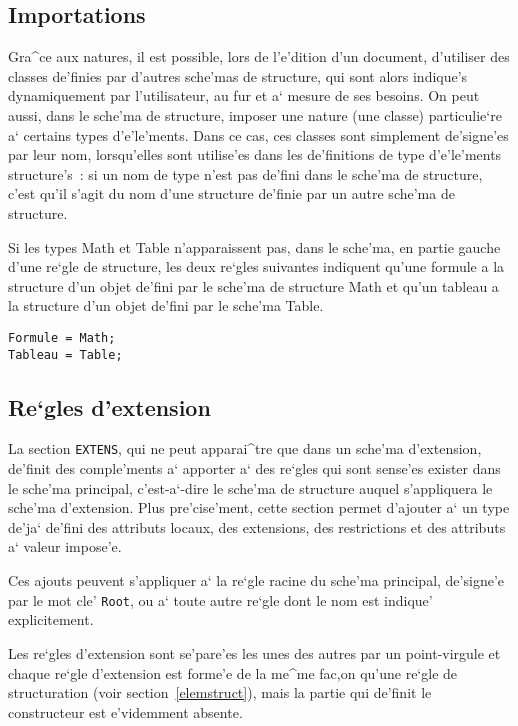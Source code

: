 {\subsection{Importations}

Gra^ce aux natures, il est possible, lors de l'e'dition d'un
document, d'utiliser des classes de'finies par d'autres sche'mas de structure,
qui sont alors indique's dynamiquement par l'utilisateur, au fur et a` mesure
de ses besoins. On peut aussi, dans le sche'ma de structure, imposer une nature
(une classe) particulie`re a` certains types d'e'le'ments. Dans ce cas, ces
classes sont simplement de'signe'es par leur nom, lorsqu'elles sont utilise'es
dans les de'finitions de type d'e'le'ments structure's~: si un nom de type
n'est pas de'fini dans le sche'ma de structure, c'est qu'il s'agit du nom
d'une structure de'finie par un autre sche'ma de structure.

\begin{example}
Si les types Math et Table n'apparaissent pas, dans le sche'ma,
en partie gauche d'une re`gle de structure, les deux re`gles suivantes
indiquent qu'une formule a la structure d'un objet de'fini par le sche'ma
de structure Math et qu'un tableau a la structure d'un objet de'fini
par le sche'ma Table.

\begin{verbatim}
Formule = Math;
Tableau = Table;
\end{verbatim}
\end{example}

\subsection{Re`gles d'extension}

La section {\tt EXTENS}, qui ne peut apparai^tre que dans un sche'ma
d'extension, de'finit des comple'ments a` apporter a` des re`gles qui
sont sense'es exister dans le sche'ma principal, c'est-a`-dire le
sche'ma de structure auquel s'appliquera le
sche'ma d'extension. Plus pre'cise'ment, cette section permet d'ajouter
a` un type de'ja` de'fini des attributs locaux, des extensions, des
restrictions et des attributs a` valeur impose'e.

Ces ajouts peuvent s'appliquer a` la re`gle racine du sche'ma principal,
de'signe'e par le mot cle' {\tt Root}, ou a` toute autre re`gle dont le nom
est indique' explicitement.

Les re`gles d'extension sont se'pare'es les unes des autres par un point-virgule
et chaque re`gle d'extension est forme'e de la me^me fac,on qu'une re`gle de
structuration (voir section~\ref{elemstruct}), mais la partie qui de'finit
le constructeur est e'videmment absente.

}
